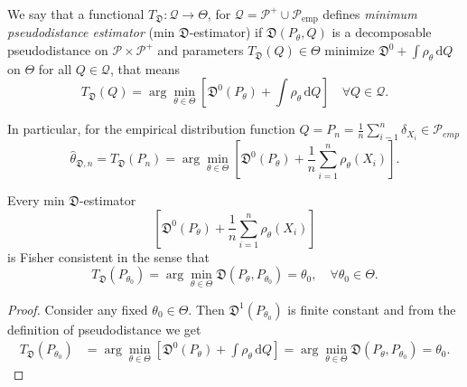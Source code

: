 \begin{definition}
	We say that a functional $T_\mathfrak{D}:\mathcal{Q} \rightarrow \Theta$, for $\mathcal{Q}=\mathcal{P}^+ \cup \mathcal{P}_{\text{emp}}$	defines \emph{minimum pseudodistance estimator} (min $\mathfrak{D}$-estimator) if $\mathfrak{D}(P_\theta,Q)$ is a decomposable pseudodistance on $\mathcal{P}\times\mathcal{P}^+$ and parameters $T_\mathfrak{D}(Q) \in \Theta$ minimize $\mathfrak{D}^0 + \int{\rho_\theta}\,\mathrm{d}Q$ on $\Theta$ for all $Q \in \mathcal{Q}$, that means
	\begin{equation}
		T_\mathfrak{D}(Q) = \arg\min_{\theta \in \Theta} \left[ \mathfrak{D}^0(P_\theta) + \int{\rho_\theta}\,\mathrm{d}Q \right] \quad \forall Q \in \mathcal{Q}.
	\end{equation}
\end{definition}
\noindent In particular, for the empirical distribution function $Q = P_n = \frac{1}{n}\sum_{i-1}^n \delta_{X_i} \in \mathcal{P}_{emp}$
\begin{equation}
	\hat{\theta}_{\mathfrak{D},n} =T_\mathfrak{D}(P_n)  = \arg\min_{\theta \in \Theta}\left[ \mathfrak{D}^0(P_\theta) + \dfrac{1}{n} \sum_{i=1}^n \rho_\theta (X_i) \right].
\end{equation}
\begin{theorem}
	Every min $\mathfrak{D}$-estimator 
	\begin{equation}
		\left[ \mathfrak{D}^0(P_\theta) + \dfrac{1}{n} \sum_{i=1}^n \rho_\theta (X_i) \right]
	\end{equation}
	is Fisher consistent in the sense that
\begin{equation}
	T_\mathfrak{D}(P_{\theta_0}) = \arg\min_{\theta \in \Theta} \mathfrak{D}(P_\theta, P_{\theta_0}) = \theta_0,\quad \forall \theta_0 \in \Theta.
\end{equation}
\end{theorem}
\begin{proof}
Consider any fixed $\theta_0 \in \Theta$. Then $\mathfrak{D}^1(P_{\theta_0})$ is finite constant and from the definition of pseudodistance we get
\begin{align*}
T_\mathfrak{D}(P_{\theta_0}) & = \arg\min_{\theta \in \Theta} \left[ \mathfrak{D}^0(P_\theta) + \int{\rho_\theta}\,\mathrm{d}Q \right] 
 = \arg\min_{\theta \in \Theta} \mathfrak{D}(P_\theta,P_{\theta_0}) 
= \theta_0.
\end{align*}
\end{proof}



